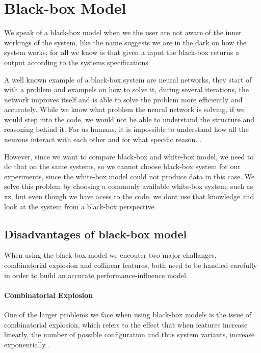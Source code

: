 \section{Black-box Model}\label{ch:Blackbox}

We speak of a black-box model when we the user are not aware of the inner workings of the system, like the name suggests we are
in the dark on how the system works, for all we know is that given a input the black-box returns a output according to the systems 
specifications. 

A well known example of a black-box system are neural networks, they start of with a problem and exampels on how to solve it, 
during several iterations, the network improves itself and is able to solve the problem
more efficiently and accurately. While we know what problem the neural network is solving, if we would step into the code, 
we would not be able to understand the structure and reasoning behind it. For us humans, it is impossible to understand how
all the neurons interact with each other and for what specific reason. \cite{NeuralNetworks}.

However, since we want to compare black-box and white-box model, we need to do that on the same systems, so
we cannot choose black-box system for our experiments, since the white-box model could not produce data in this case.
We solve this problem by choosing a commonly available white-box system, such as xz, but even though we have acess to the code, we dont use
that knowledge and look at the system from a black-box perspective.

\subsection{Disadvantages of black-box model}
When using the black-box model we encouter two major challanges, combinatorial explosion and collinear features, both need to be
handled carefully in order to build an accurate performance-influence model.

\paragraph{Combinatorial Explosion}
One of the larger problems we face when using black-box models is the issue of combinatorial explosion, 
which refers to the effect that when features increase linearly, the number of possible configuration and thus system variants,
 increase exponentially \cite{Combinatorial-explosion}.

